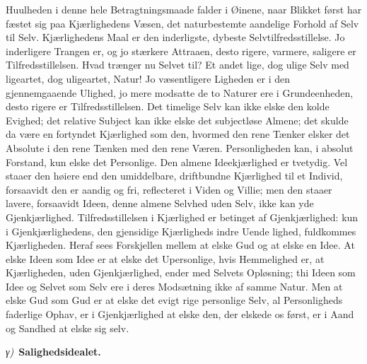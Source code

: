 \documentclass[12pt]{book}
\newcommand{\greekrun}[2]{%
  \medskip\begin{center}{\itshape #1)}\ {\bfseries #2}\end{center}\medskip}
\begin{document}
Huulheden i denne hele Betragtningsmaade falder i Øinene, naar
Blikket først har fæstet sig paa Kjærlighedens Væsen, det
naturbestemte aandelige Forhold af Selv til Selv. Kjærlighedens Maal
er den inderligste, dybeste Selvtilfredsstillelse. Jo inderligere
Trangen er, og jo stærkere Attraaen, desto rigere, varmere, saligere
er Tilfredsstillelsen. Hvad trænger nu Selvet til? Et andet lige,
dog ulige Selv med ligeartet, dog uligeartet, Natur! Jo væsentligere
Ligheden er i den gjennemgaaende Ulighed, jo mere modsatte de to
Naturer ere i Grundeenheden, desto rigere er Tilfredsstillelsen. Det
timelige Selv kan ikke elske den kolde Evighed; det relative Subject
kan ikke elske det subjectløse Almene; det skulde da være en
fortyndet Kjærlighed som den, hvormed den rene Tænker elsker det
Absolute i den rene Tænken med den rene Væren. Personligheden kan, i
absolut Forstand, kun elske det Personlige. Den almene
Ideekjærlighed er tvetydig. Vel staaer den høiere end den
umiddelbare, driftbundne Kjærlighed til et Individ, forsaavidt den
er aandig og fri, reflecteret i Viden og Villie; men den staaer
lavere, forsaavidt Ideen, denne almene Selvhed uden Selv, ikke kan
yde Gjenkjærlighed. Tilfredsstillelsen i Kjærlighed er betinget af
Gjenkjærlighed: kun i Gjenkjærlighedens, den gjensidige Kjærligheds
indre Uende\-
lighed, fuldkommes Kjærligheden. Heraf sees Forskjellen mellem at
elske Gud og at elske en Idee. At elske Ideen som Idee er at elske
det Upersonlige, hvis Hemmelighed er, at Kjærligheden, uden
Gjenkjærlighed, ender med Selvets Opløsning; thi Ideen som Idee og
Selvet som Selv ere i deres Modsætning ikke af samme Natur. Men at
elske Gud som Gud er at elske det evigt rige personlige Selv, al
Personligheds faderlige Ophav, er i Gjenkjærlighed at elske den, der
elskede os først, er i Aand og Sandhed at elske sig selv.

\greekrun{γ}{Salighedsidealet.}
\end{document}
